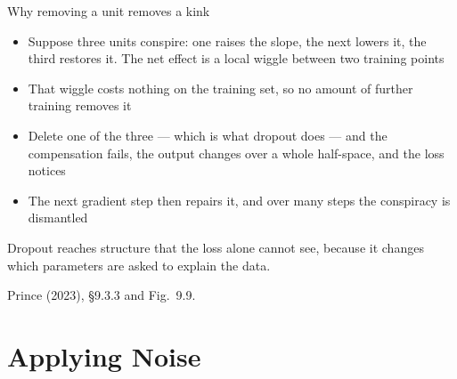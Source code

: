 \documentclass[aspectratio=169, 11pt]{beamer}
\newcommand{\srcline}[1]{%
  \par\vspace{0.25em}%
  {\scriptsize\color{mcMuted}\hfill #1\par}}
\newcommand{\src}[3]{}      %
\begin{document}
\begin{frame}{Why removing a unit removes a kink}
  \src{prince2023}{figure}{9.9}
  \src{prince2023}{section}{9.3.3}
  \vspace{0.15em}
  {\footnotesize
  \begin{itemize}\itemsep0.28em
    \item Suppose three units conspire: one raises the slope, the next
          lowers it, the third restores it. The net effect is a local
          wiggle between two training points
    \item That wiggle costs nothing on the training set, so no amount of
          further training removes it
    \item Delete one of the three --- which is what dropout does --- and
          the compensation fails, the output changes over a whole
          half-space, and the loss notices
    \item The next gradient step then repairs it, and over many steps
          the conspiracy is dismantled
  \end{itemize}}
  \vspace{0.1em}
  \begin{redhighlight}
    Dropout reaches structure that the loss alone cannot see, because it
    changes which parameters are asked to explain the data.
  \end{redhighlight}
  \srcline{Prince (2023), \S9.3.3 and Fig.~9.9.}
\end{frame}

\section{Applying Noise}
\end{document}
